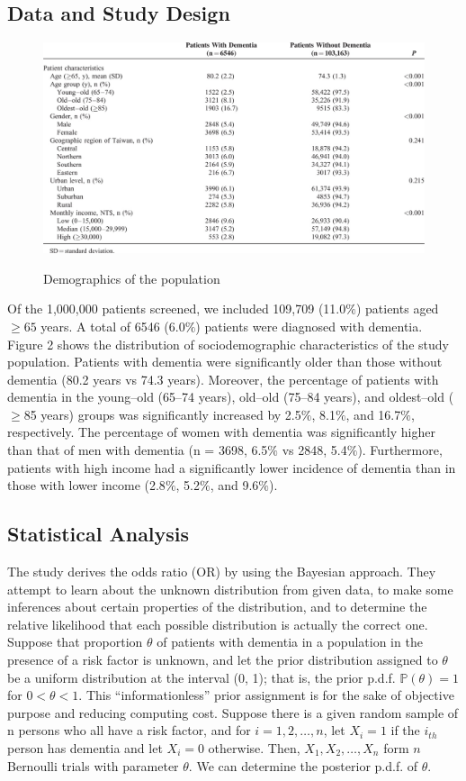 \documentclass[12pt,letterpaper]{article}
\begin{document}
\subsection{Data and Study Design}
\begin{figure}[t]
\centering
\includegraphics[width=1\linewidth]{bayesian_table1.jpeg}
\label{fig:bayesian_table1}
\caption{Demographics of the population}
\end{figure}

Of the 1,000,000 patients screened, we included 109,709 (11.0$\%$) patients aged $\geq 65$ years. A total of 6546 (6.0$\%$) patients were diagnosed with dementia. Figure 2 shows the distribution of sociodemographic characteristics of the study population. Patients with dementia were significantly older than those without dementia (80.2 years vs 74.3 years). Moreover, the percentage of patients with dementia in the young–old (65–74 years), old–old (75–84 years), and oldest–old ($\geq$85 years) groups was significantly increased by 2.5$\%$, 8.1$\%$, and 16.7$\%$, respectively. The percentage of women with dementia was significantly higher than that of men with dementia (n = 3698, 6.5$\%$ vs 2848, 5.4$\%$). Furthermore, patients with high income had a significantly lower incidence of dementia than in those with lower income (2.8$\%$, 5.2$\%$, and 9.6$\%$).

\subsection{Statistical Analysis}
The study derives the odds ratio (OR) by using the Bayesian approach. They attempt to learn about the unknown
distribution from given data, to make some inferences about certain properties of the distribution, and to determine the relative likelihood that each possible distribution is actually the correct one. Suppose that proportion $\theta$
of patients with dementia in a population in the presence of a risk factor is unknown, and let the prior distribution assigned to $\theta$ be a uniform distribution at the interval (0, 1); that is, the prior p.d.f. $\mathbb{P}(\theta) = 1$ for $0 < \theta < 1$. This “informationless” prior assignment is for the sake of objective purpose and reducing computing cost. Suppose there is a given random sample of n persons who all have a risk factor, and for $i = 1, 2, \dots, n$, let $X_i = 1$ if the $i_{th}$ person has dementia and let $X_i = 0$ otherwise. Then, $X_1, X_2, \dots, X_n$ form $n$ Bernoulli trials with parameter $\theta$. We can determine
the posterior p.d.f. of $\theta$.
\end{document}
